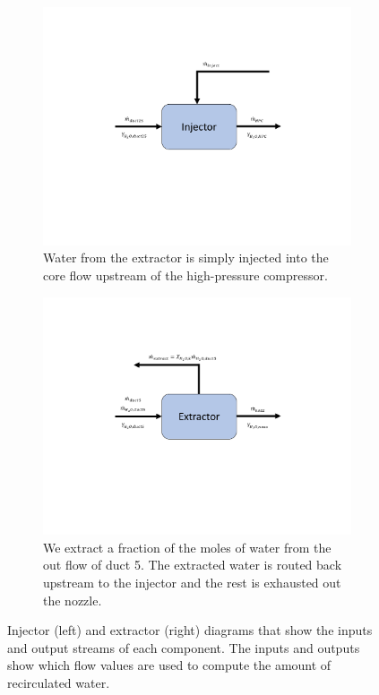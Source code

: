 \documentclass[conf]{new-aiaa}
\begin{document}
\begin{figure}[hbt!]
    \centering
    \begin{subfigure}[t]{0.49\textwidth}
        \includegraphics[width=\textwidth]{injector.pdf}
        \caption{
            Water from the extractor is simply injected into the core flow upstream of the high-pressure compressor.
        }
        \label{fig:injector}
    \end{subfigure}
    \hspace{2pt}
    \begin{subfigure}[t]{0.49\textwidth}
        \includegraphics[width=\textwidth]{extractor.pdf}
        \caption{
            We extract a fraction of the moles of water from the out flow of duct 5.
            The extracted water is routed back upstream to the injector and the rest is exhausted out the nozzle.
        }
        \label{fig:extractor}
    \end{subfigure}
    \caption{Injector (left) and extractor (right) diagrams that show the inputs and output streams of each component.
        The inputs and outputs show which flow values are used to compute the amount of recirculated water.}
    \label{fig:extract_inject}
\end{figure}
\end{document}
